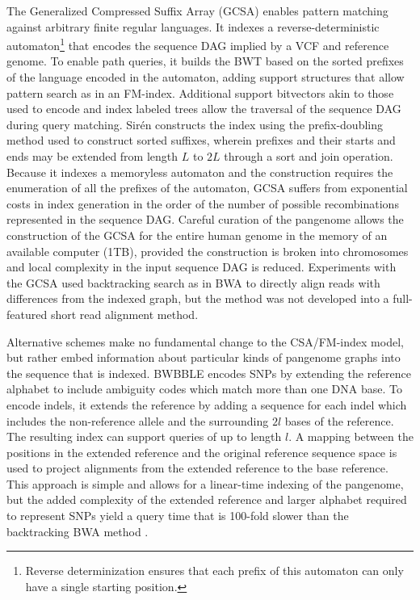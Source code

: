 \documentclass[a4paper,12pt,numbered,oneside]{Classes/PhDThesisPSnPDF}
\begin{document}
The Generalized Compressed Suffix Array (GCSA) \cite{siren2011indexing,siren2014indexing} enables pattern matching against arbitrary finite regular languages.
It indexes a reverse-deterministic automaton\footnote{Reverse determinization ensures that each prefix of this automaton can only have a single starting position.} that encodes the sequence DAG implied by a VCF and reference genome.
To enable path queries, it builds the BWT based on the sorted prefixes of the language encoded in the automaton, adding support structures that allow pattern search as in an FM-index.
Additional support bitvectors akin to those used to encode and index labeled trees \cite{ferragina2005structuring} allow the traversal of the sequence DAG during query matching.
Sir\'{e}n constructs the index using the prefix-doubling method used to construct sorted suffixes, wherein prefixes and their starts and ends may be extended from length $L$ to $2L$ through a sort and join operation.
Because it indexes a memoryless automaton and the construction requires the enumeration of all the prefixes of the automaton, GCSA suffers from exponential costs in index generation in the order of the number of possible recombinations represented in the sequence DAG.
Careful curation of the pangenome allows the construction of the GCSA for the entire human genome in the memory of an available computer (1TB), provided the construction is broken into chromosomes and local complexity in the input sequence DAG is reduced.
Experiments with the GCSA used backtracking search as in BWA \cite{li2009fast} to directly align reads with differences from the indexed graph, but the method was not developed into a full-featured short read alignment method.

Alternative schemes make no fundamental change to the CSA/FM-index model, but rather embed information about particular kinds of pangenome graphs into the sequence that is indexed.
BWBBLE \cite{huang2013short} encodes SNPs by extending the reference alphabet to include ambiguity codes which match more than one DNA base.
To encode indels, it extends the reference by adding a sequence for each indel which includes the non-reference allele and the surrounding $2l$ bases of the reference.
The resulting index can support queries of up to length $l$.
A mapping between the positions in the extended reference and the original reference sequence space is used to project alignments from the extended reference to the base reference.
This approach is simple and allows for a linear-time indexing of the pangenome, but the added complexity of the extended reference and larger alphabet required to represent SNPs yield a query time that is 100-fold slower than the backtracking BWA method \cite{huang2013short}.
\end{document}
